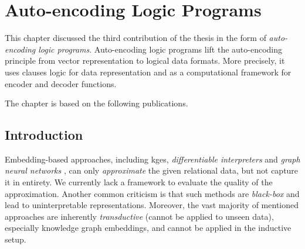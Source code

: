 \chapter{Auto-encoding Logic Programs}\label{ch:alps}


This chapter discussed the third contribution of the thesis in the form of \textit{auto-encoding logic programs}.
Auto-encoding logic programs lift the auto-encoding principle from vector representation to logical data formats.
More precisely, it uses clauses logic for data representation and  as a computational framework for encoder and decoder functions.


The chapter is based on the following publications.

\begin{quote}
\end{quote}

\begin{quote}
\end{quote}



\section{Introduction}





Embedding-based approaches, including \gls{kge}s, \textit{differentiable interpreters} \cite{DTP2017,bosnjak17,Reed:2016} and \textit{graph neural networks} \cite{Scarselli:2009:GNN:1657477.1657482,DBLP:conf/icml/NiepertAK16,ae482107de73461787258f805cf8f4ed},  can only \textit{approximate} the given relational data, but not capture it in entirety.
We currently lack a framework to evaluate the quality of the approximation.
Another common criticism is that such methods are \textit{black-box} and lead to uninterpretable representations.
Moreover, the vast majority of mentioned approaches are inherently \textit{transductive} (cannot be applied to unseen data), especially knowledge graph embeddings, and cannot be applied in the inductive setup.



